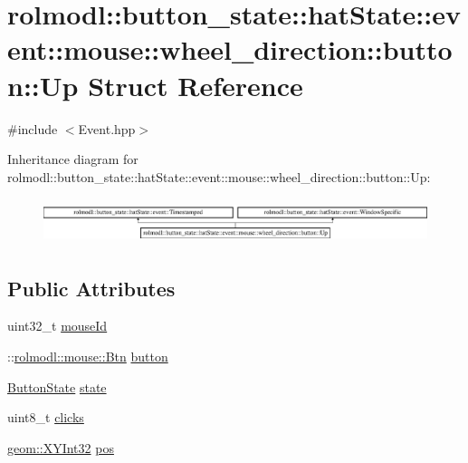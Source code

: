 \hypertarget{structrolmodl_1_1button__state_1_1hat_state_1_1event_1_1mouse_1_1wheel__direction_1_1button_1_1_up}{}\section{rolmodl\+::button\+\_\+state\+::hat\+State\+::event\+::mouse\+::wheel\+\_\+direction\+::button\+::Up Struct Reference}
\label{structrolmodl_1_1button__state_1_1hat_state_1_1event_1_1mouse_1_1wheel__direction_1_1button_1_1_up}


{\ttfamily \#include $<$Event.\+hpp$>$}

Inheritance diagram for rolmodl\+::button\+\_\+state\+::hat\+State\+::event\+::mouse\+::wheel\+\_\+direction\+::button\+::Up\+:\begin{figure}[H]
\begin{center}
\leavevmode
\includegraphics[height=1.333333cm]{structrolmodl_1_1button__state_1_1hat_state_1_1event_1_1mouse_1_1wheel__direction_1_1button_1_1_up}
\end{center}
\end{figure}
\subsection*{Public Attributes}
\begin{DoxyCompactItemize}
\item 
uint32\+\_\+t \mbox{\hyperlink{structrolmodl_1_1button__state_1_1hat_state_1_1event_1_1mouse_1_1wheel__direction_1_1button_1_1_up_aa2c7913dd6e6ed99133bd00b4d9d2053}{mouse\+Id}}
\item 
\+::\mbox{\hyperlink{namespacerolmodl_1_1rolmodl_1_1mouse_a5ed523191c7ec81f6e69f02b9a616ebf}{rolmodl\+::mouse\+::\+Btn}} \mbox{\hyperlink{structrolmodl_1_1button__state_1_1hat_state_1_1event_1_1mouse_1_1wheel__direction_1_1button_1_1_up_aa8643220eaca671e77190d149ab3dfd9}{button}}
\item 
\mbox{\hyperlink{namespacerolmodl_ad08ec5c56aa1db118f871357b2d475fd}{Button\+State}} \mbox{\hyperlink{structrolmodl_1_1button__state_1_1hat_state_1_1event_1_1mouse_1_1wheel__direction_1_1button_1_1_up_a9a3e21d59b53d4c5db61c6fcd0466bae}{state}}
\item 
uint8\+\_\+t \mbox{\hyperlink{structrolmodl_1_1button__state_1_1hat_state_1_1event_1_1mouse_1_1wheel__direction_1_1button_1_1_up_a4033d346574b46503d88ceb3d76a7890}{clicks}}
\item 
\mbox{\hyperlink{structrolmodl_1_1geom_1_1_x_y_int32}{geom\+::\+X\+Y\+Int32}} \mbox{\hyperlink{structrolmodl_1_1button__state_1_1hat_state_1_1event_1_1mouse_1_1wheel__direction_1_1button_1_1_up_a3a53ff60ddb24e04506c1b439224254e}{pos}}
\end{DoxyCompactItemize}


